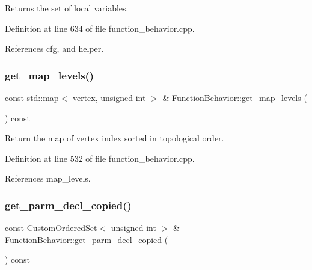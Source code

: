 Returns the set of local variables. 



Definition at line 634 of file function\+\_\+behavior.\+cpp.



References cfg, and helper.

\mbox{\label{classFunctionBehavior_a7b60365fa80bdf92ca842bae4b5c49eb}} 
\subsubsection{\texorpdfstring{get\+\_\+map\+\_\+levels()}{get\_map\_levels()}}
{\footnotesize\ttfamily const std\+::map$<$ \hyperlink{graph_8hpp_abefdcf0544e601805af44eca032cca14}{vertex}, unsigned int $>$ \& Function\+Behavior\+::get\+\_\+map\+\_\+levels (\begin{DoxyParamCaption}{ }\end{DoxyParamCaption}) const}



Return the map of vertex index sorted in topological order. 



Definition at line 532 of file function\+\_\+behavior.\+cpp.



References map\+\_\+levels.

\mbox{\label{classFunctionBehavior_ac629d472b15dbc6c1ccf88a15602edac}} 
\subsubsection{\texorpdfstring{get\+\_\+parm\+\_\+decl\+\_\+copied()}{get\_parm\_decl\_copied()}}
{\footnotesize\ttfamily const \hyperlink{classCustomOrderedSet}{Custom\+Ordered\+Set}$<$ unsigned int $>$ \& Function\+Behavior\+::get\+\_\+parm\+\_\+decl\+\_\+copied (\begin{DoxyParamCaption}{ }\end{DoxyParamCaption}) const}



